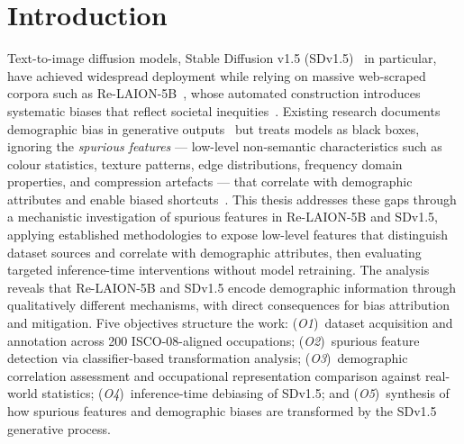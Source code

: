 \section{Introduction}

Text-to-image diffusion models, Stable Diffusion v1.5 (SDv1.5)~\cite{Rombach_2022_CVPR}
in particular, have achieved widespread deployment while relying on massive web-scraped
corpora such as Re-LAION-5B~\cite{Schuhmann_2022_Laion5b}, whose automated construction
introduces systematic biases that reflect societal
inequities~\cite{Birhane_2021_MultiModalDatasetsMisogynyPornography}. Existing research
documents demographic bias in generative
outputs~\cite{Luccioni_2023_AnalyzingSocietalRepresentationsDiffusionModels,
    Bianchi_2023_TTIGenAmplifiesDemographicStereotypes} but treats models as black boxes,
ignoring the \emph{spurious features} — low-level non-semantic characteristics such as
colour statistics, texture patterns, edge distributions, frequency domain properties, and
compression artefacts — that correlate with demographic attributes and enable biased
shortcuts~\cite{Meister_2023_GenderArtifactsinVisualDatasets,
    Zeng_2024_UnderstandingBiasinLargeScaleVisualDatasets}. This thesis addresses these gaps
through a mechanistic investigation of spurious features in Re-LAION-5B and SDv1.5,
applying established methodologies to expose low-level features that distinguish dataset
sources and correlate with demographic attributes, then evaluating targeted
inference-time interventions without model retraining. The analysis reveals that
Re-LAION-5B and SDv1.5 encode demographic information through qualitatively different
mechanisms, with direct consequences for bias attribution and mitigation. Five objectives
structure the work: (\textit{O1})~dataset acquisition and annotation across 200
ISCO-08-aligned occupations; (\textit{O2})~spurious feature detection via classifier-based
transformation analysis; (\textit{O3})~demographic correlation assessment and
occupational representation comparison against real-world statistics;
(\textit{O4})~inference-time debiasing of SDv1.5; and (\textit{O5})~synthesis of how
spurious features and demographic biases are transformed by the SDv1.5 generative
process.
